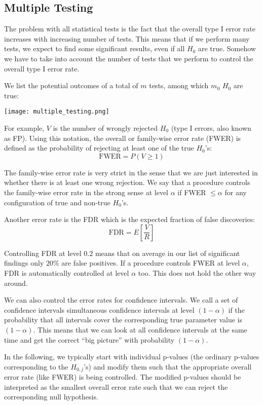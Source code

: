\subsection{Multiple Testing}

The problem with all statistical tests is the fact that the overall type I error rate increases with increasing number of tests. This means that if we perform many tests, we expect to find some significant results, even if all $H_0$ are true. Somehow we have to take into account the number of tests that we perform to control the overall type I error rate. \medskip

We list the potential outcomes of a total of $m$ tests, among which $m_0$ $H_0$ are true:
\begin{center}
	\texttt{[image: multiple\_testing.png]}
\end{center}

For example, $V$ is the number of wrongly rejected $H_0$ (type I errors, also known as FP). Using this notation, the overall or family-wise error rate (FWER) is defined as the probability of rejecting at least one of the true $H_0$'s:
$$\text{FWER} = P(V \geq 1)$$

The family-wise error rate is very strict in the sense that we are just interested in whether there is at least one wrong rejection. We say that a procedure controls the family-wise error rate in the strong sense at level $\alpha$ if FWER $\leq \alpha$ for any configuration of true and non-true $H_0$'s. \medskip

Another error rate is the FDR which is the expected fraction of false discoveries:
$$\text{FDR} = E \left[ \frac{V}{R} \right]$$

Controlling FDR at level $0.2$ means that on average in our list of significant findings only $20\%$ are false positives. If a procedure controls FWER at level $\alpha$, FDR is automatically controlled at level $\alpha$ too. This does not hold the other way around. \medskip

We can also control the error rates for confidence intervals. We call a set of confidence intervals simultaneous confidence intervals at level $(1 - \alpha)$ if the probability that all intervals cover the corresponding true parameter value is $(1 - \alpha)$. This means that we can look at all confidence intervals at the same time and get the correct “big picture” with probability $(1 - \alpha)$. \medskip

In the following, we typically start with individual p-values (the ordinary p-values corresponding to the $H_{0,j}$'s) and modify them such that the appropriate overall error rate (like FWER) is being controlled. The modified p-values should be interpreted as the smallest overall error rate such that we can reject the corresponding null hypothesis.


